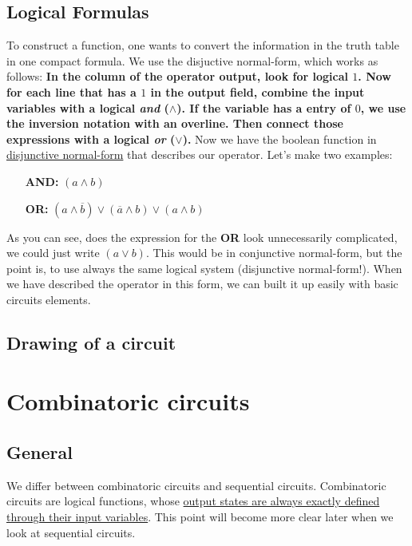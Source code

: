 \documentclass[10pt,a4paper]{article}
\begin{document}
\subsection{Logical Formulas}
To construct a function, one wants to convert the information in the truth table in one compact formula. We use the disjuctive normal-form, which works as follows: 
\newline \textbf{In the column of the operator output, look for logical $1$. Now for each line that has a $1$ in the output field, combine the input variables with a logical \textit{and} ($\land$). If the variable has a entry of $0$, we use the inversion notation with an overline. Then connect those expressions with a logical \textit{or} ($\lor$).} 
\newline Now we have the boolean function in \underline{disjunctive normal-form} that describes our operator. Let's make two examples: \newline
\begin{enumerate}
 \item [\textbf{AND:}]$(a\land b)$
 \item [\textbf{OR:}]$(a\land \overline{b})\lor(\overline{a}\land b)\lor(a\land b)$
\end{enumerate}

As you can see, does the expression for the \textbf{OR} look unnecessarily complicated, we could just write $(a\lor b)$. This would be in conjunctive normal-form, but the point is, to use always the same logical system (disjunctive normal-form!). When we have described the operator in this form, we can built it up easily with basic circuits elements.  

\subsection{Drawing of a circuit}


\section{Combinatoric circuits}
\subsection{General}
We differ between combinatoric circuits and sequential circuits. Combinatoric circuits are logical functions, whose \underline{output states are always exactly defined through their input variables}. This point will become more clear later when we look at sequential circuits. 
\end{document}
